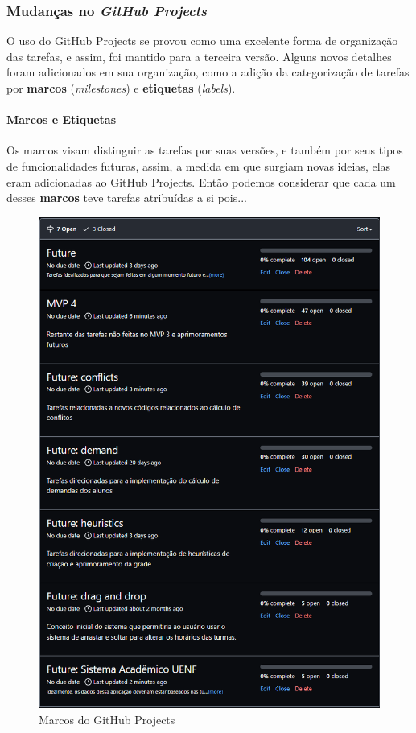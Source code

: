 \subsubsection{Mudanças no \textit{GitHub Projects}}

O uso do GitHub Projects se provou como uma excelente forma de organização das tarefas, e assim, foi mantido para a terceira versão. Alguns novos detalhes foram adicionados em sua organização, como a adição da categorização de tarefas por \textbf{marcos} (\textit{milestones}) e \textbf{etiquetas} (\textit{labels}).

\paragraph*{Marcos e Etiquetas}

Os marcos visam distinguir as tarefas por suas versões, e também por seus tipos de funcionalidades futuras, assim, a medida em que surgiam novas ideias, elas eram adicionadas ao GitHub Projects. Então podemos considerar que cada um desses \textbf{marcos} teve tarefas atribuídas a si pois...

\begin{figure}[htbp]
  \centering
  \caption{Marcos do GitHub Projects\label{fig:ProjectsMilestones}}
  \includegraphics[scale=0.6]{files/img/Codificacao/GitHubProjects - Open Milestones.png}
  \legend{\selfAuthor}
\end{figure}

